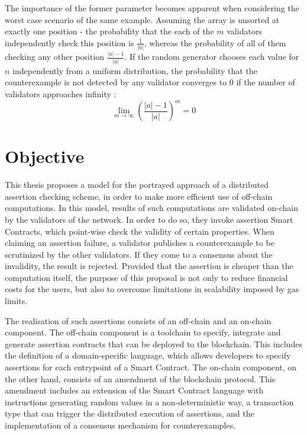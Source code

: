 The importance of the former parameter becomes apparent when considering the worst case scenario of the same example. Assuming the array is unsorted at exactly one position - the probability that the each of the $m$ validators independently check this position is $\frac{1}{|a|}$, whereas the probability of all of them checking any other position $\frac{|a|-1}{|a|}$. If the random generator chooses each value for $n$ independently from a uniform distribution, the probability that the counterexample is not detected by any validator converges to 0 if the number of validators approaches infinity \cite{thiemann_2020}:
\begin{equation}\label{eq:limes_validators}
	\lim_{m\to\infty} \left(\frac{|a|-1}{|a|}\right)^m = 0
\end{equation}

\section{Objective}
This thesis proposes a model for the portrayed approach of a distributed assertion checking scheme, in order to make more efficient use of off-chain computations. In this model, results of such computations are validated on-chain by the validators of the network. In order to do so, they invoke assertion Smart Contracts, which point-wise check the validity of certain properties. When claiming an assertion failure, a validator publishes a counterexample to be scrutinized by the other validators. If they come to a consensus about the invalidity, the result is rejected. Provided that the assertion is cheaper than the computation itself, the purpose of this proposal is not only to reduce financial costs for the users, but also to overcome limitations in scalability imposed by gas limits.

The realisation of such assertions consists of an off-chain and an on-chain component. The off-chain component is a toolchain to specify, integrate and generate assertion contracts that can be deployed to the blockchain. This includes the definition of a domain-specific language, which allows developers to specify assertions for each entrypoint of a Smart Contract. The on-chain component, on the other hand, consists of an amendment of the blockchain protocol. This amendment includes an extension of the Smart Contract language with instructions generating random values in a non-deterministic way, a transaction type that can trigger the distributed execution of assertions, and the implementation of a consensus mechanism for counterexamples. 

